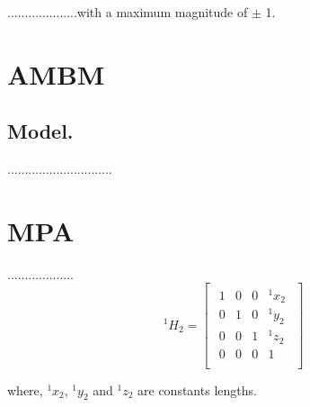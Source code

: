 ....................with a maximum magnitude of $\pm$ 1. 

\section{AMBM}
\subsection{ Model.} 
\label{AMB Nonlinear Model}
..............................

\section{MPA}
\label{Micro-Positioning}
...................
\begin{equation}
\label{m1}
^1H_2 =  \begin{bmatrix}
\begin{array}{ccc|c}
1 & 0 & 0 &  ^1x_2 \\
0 & 1 & 0 &  ^1y_2 \\
0 & 0 & 1 &  ^1z_2 \\
\hline
0 & 0 & 0 &  1 \\
\end{array} 
\end{bmatrix}
\end{equation}

where, $^1x_2$, $^1y_2$ and $^1z_2$ are constants lengths.


